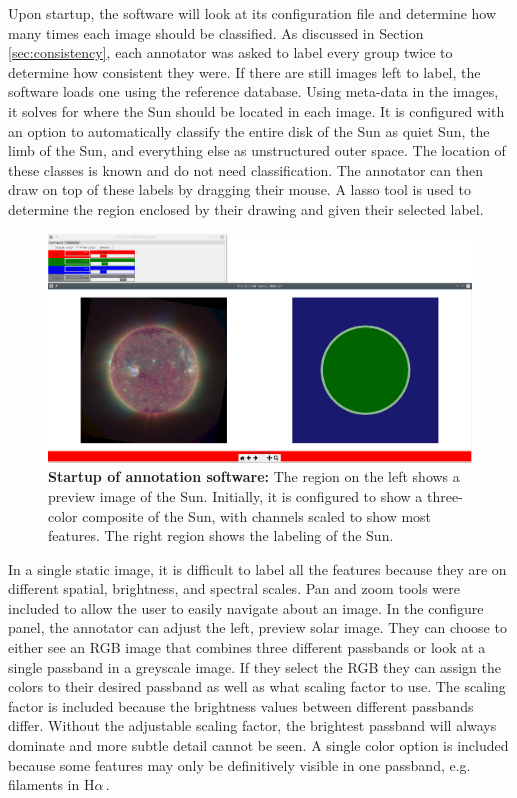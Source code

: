 \documentclass[twoside]{report}
\newcommand{\halpha}{H$\alpha$\,}
\begin{document}
Upon startup, the software will look at its configuration file and determine how many times each image should be classified. As discussed in Section \ref{sec:consistency}, each annotator was asked to label every group twice to determine how consistent they were. If there are still images left to label, the software loads one using the reference database. Using meta-data in the images, it solves for where the Sun should be located in each image. It is configured with an option to automatically classify the entire disk of the Sun as quiet Sun, the limb of the Sun, and everything else as unstructured outer space. The location of these classes is known and do not need classification. The annotator can then draw on top of these labels by dragging their mouse. A lasso tool is used to determine the region enclosed by their drawing and given their selected label.

\begin{figure}[ht]
  \begin{center}
    \includegraphics[scale=0.25]{labeling-initial}
    \caption{{\bf Startup of annotation software:} The region on the left shows a preview image of the Sun. Initially, it is configured to show a three-color composite of the Sun, with channels scaled to show most features. The right region shows the labeling of the Sun.}
    \label{fig:label-initial}
 \end{center}
\end{figure}

In a single static image, it is difficult to label all the features because they are on different spatial, brightness, and spectral scales. Pan and zoom tools were included to allow the user to easily navigate about an image. In the configure panel, the annotator can adjust the left, preview solar image. They can choose to either see an RGB image that combines three different passbands or look at a single passband in a greyscale image. If they select the RGB they can assign the colors to their desired passband as well as what scaling factor to use. The scaling factor is included because the brightness values between different passbands differ. Without the adjustable scaling factor, the brightest passband will always dominate and more subtle detail cannot be seen. A single color option is included because some features may only be definitively visible in one passband, e.g. filaments in \halpha. 
\end{document}
